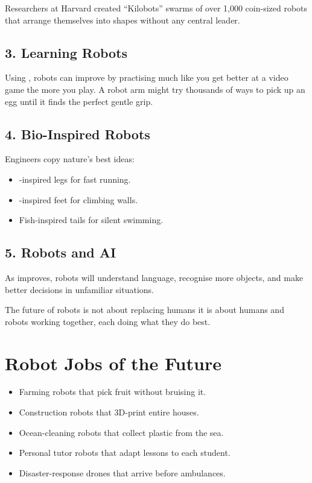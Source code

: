 \begin{funfact}
  Researchers at Harvard created ``Kilobots'' \textemdash{} swarms of over
  1,000 coin-sized robots that arrange themselves into shapes
  without any central leader.
\end{funfact}

\subsection*{3. Learning Robots}

Using , robots can improve by practising \textemdash{}
much like you get better at a video game the more you play.
A robot arm might try thousands of ways to pick up an egg until
it finds the perfect gentle grip.

\subsection*{4. Bio-Inspired Robots}

Engineers copy nature's best ideas:
\begin{itemize}
  \item {}-inspired legs for fast running.
  \item {}-inspired feet for climbing walls.
  \item Fish-inspired tails for silent swimming.
\end{itemize}

\subsection*{5. Robots and AI}

As  improves, robots will understand language,
recognise more objects, and make better decisions in unfamiliar situations.

\begin{bigidea}
  The future of robots is not about replacing humans \textemdash{}
  it is about humans and robots working together, each doing
  what they do best.
\end{bigidea}

\sectionrule

\section*{Robot Jobs of the Future}

\begin{itemize}
  \item Farming robots that pick fruit without bruising it.
  \item Construction robots that 3D-print entire houses.
  \item Ocean-cleaning robots that collect plastic from the sea.
  \item Personal tutor robots that adapt lessons to each student.
  \item Disaster-response drones that arrive before ambulances.
\end{itemize}

